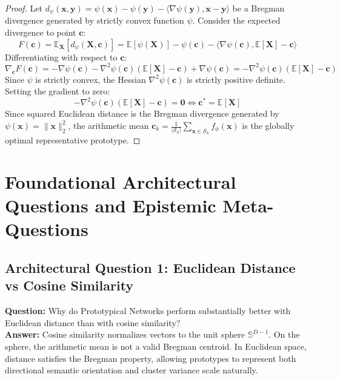 \documentclass[11pt,a4paper]{article}
\theoremstyle{definition}
\begin{document}
\begin{proof}
Let $d_\psi(\mathbf{x}, \mathbf{y}) = \psi(\mathbf{x}) - \psi(\mathbf{y}) - \langle \nabla \psi(\mathbf{y}), \mathbf{x} - \mathbf{y} \rangle$ be a Bregman divergence generated by strictly convex function $\psi$.
Consider the expected divergence to point $\mathbf{c}$:
{\boldmath
\begin{equation}
F(\mathbf{c}) = \mathbb{E}_{\mathbf{X}}[d_\psi(\mathbf{X}, \mathbf{c})] = \mathbb{E}[\psi(\mathbf{X})] - \psi(\mathbf{c}) - \langle \nabla \psi(\mathbf{c}), \mathbb{E}[\mathbf{X}] - \mathbf{c} \rangle
\end{equation}
}
Differentiating with respect to $\mathbf{c}$:
{\boldmath
\begin{equation}
\nabla_\mathbf{c} F(\mathbf{c}) = -\nabla \psi(\mathbf{c}) - \nabla^2 \psi(\mathbf{c})(\mathbb{E}[\mathbf{X}] - \mathbf{c}) + \nabla \psi(\mathbf{c}) = -\nabla^2 \psi(\mathbf{c})(\mathbb{E}[\mathbf{X}] - \mathbf{c})
\end{equation}
}
Since $\psi$ is strictly convex, the Hessian $\nabla^2 \psi(\mathbf{c})$ is strictly positive definite. Setting the gradient to zero:
{\boldmath
\begin{equation}
-\nabla^2 \psi(\mathbf{c})(\mathbb{E}[\mathbf{X}] - \mathbf{c}) = \mathbf{0} \iff \mathbf{c}^* = \mathbb{E}[\mathbf{X}]
\end{equation}
}
Since squared Euclidean distance is the Bregman divergence generated by $\psi(\mathbf{x}) = \|\mathbf{x}\|_2^2$, the arithmetic mean $\mathbf{c}_k = \frac{1}{|\mathcal{S}_k|}\sum_{\mathbf{x} \in \mathcal{S}_k} f_\phi(\mathbf{x})$ is the globally optimal representative prototype.
\end{proof}

\section{Foundational Architectural Questions and Epistemic Meta-Questions}

\subsection{Architectural Question 1: Euclidean Distance vs Cosine Similarity}
\textbf{Question:} Why do Prototypical Networks perform substantially better with Euclidean distance than with cosine similarity?\\
\textbf{Answer:} Cosine similarity normalizes vectors to the unit sphere $\mathbb{S}^{D-1}$. On the sphere, the arithmetic mean is not a valid Bregman centroid. In Euclidean space, distance satisfies the Bregman property, allowing prototypes to represent both directional semantic orientation and cluster variance scale naturally.
\end{document}
